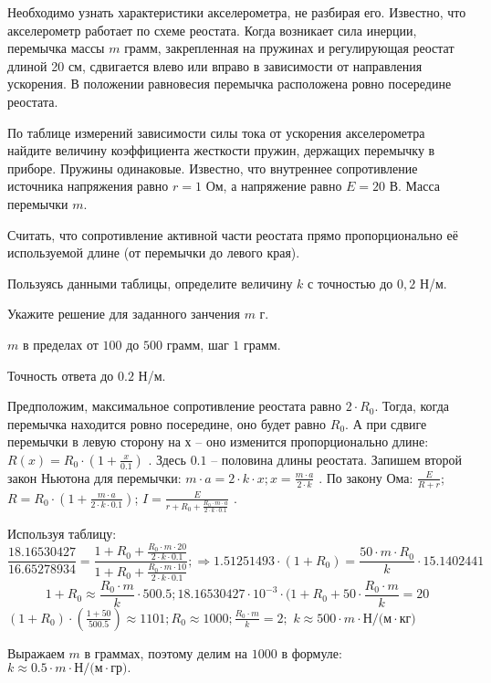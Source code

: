 
Необходимо узнать характеристики
акселерометра, не разбирая его. Известно, что акселерометр работает по схеме реостата. Когда возникает сила инерции,
перемычка массы $m$ грамм, закрепленная на пружинах и регулирующая реостат длиной
20 см, сдвигается влево или
вправо в зависимости от направления ускорения. В положении равновесия перемычка
расположена ровно посередине реостата.


По таблице измерений зависимости силы тока от
ускорения акселерометра найдите величину коэффициента жесткости пружин, держащих перемычку в приборе. Пружины
одинаковые. Известно, что
внутреннее сопротивление источника напряжения равно $r = 1$ Ом, а напряжение равно $E = 20$ В.  Масса
перемычки $m$.


Считать, что сопротивление активной части реостата прямо
пропорционально её используемой длине (от перемычки до левого края).

Пользуясь данными таблицы, определите величину $k$ с точностью до $0,2$ Н/м.

Укажите решение для заданного занчения $m$ г.

\paramSection

$m$ в пределах от $100$ до $500$ грамм, шаг $1$ грамм.  

Точность ответа  до  $0.2$  Н/м.

\solutionSection

Предположим, максимальное сопротивление реостата равно $2 \cdot R_0$. Тогда, когда перемычка находится 
ровно посередине, оно будет равно $R_0$. А при сдвиге перемычки в левую сторону на $х$ – оно изменится 
пропорционально длине: \linebreak $R(x)=R_0 \cdot (1+\frac{x}{0.1})$ . Здесь $0.1$ – половина длины реостата. 
Запишем второй закон Ньютона для перемычки:
$m \cdot a=2 \cdot k \cdot x;  x=\frac{m \cdot a}{2 \cdot k}$   . По закону Ома:   
$\frac{E}{R+r}$; $R=R_0 \cdot \left(1+\frac{m \cdot a}{2 \cdot k \cdot 0.1}\right)$; 
$I=  \frac{E}{r+R_0+\frac{R_0 \cdot m \cdot a}{2 \cdot k \cdot 0.1}}$ . 

Используя таблицу:
$$\frac{18.16530427}{16.65278934}=\frac{1+R_0+\frac{R_0 \cdot m \cdot 20}{2 \cdot k \cdot 0.1}}{1+R_0+\frac{R_0 \cdot m \cdot 10}{2 \cdot k \cdot 0.1}}; \Rightarrow  1.51251493 \cdot (1+R_0 )=\frac{50 \cdot m \cdot R_0}{k} \cdot 15.1402441$$
$$1+R_0 \approx   \frac{R_0 \cdot m}{k}   \cdot 500.5;  18.16530427 \cdot 10^{-3} \cdot (1+R_0+50 \cdot \frac{R_0 \cdot m}{k}=20$$
$(1+R_0 ) \cdot \left(\frac{1+50}{500.5}\right) \approx 1101;  R_0 \approx 1000;   \frac{R_0 \cdot m}{k}=2;$ 
$k \approx 500 \cdot m \cdot \text{Н/(м} \cdot \text{кг}) $  

Выражаем $m$ в граммах, поэтому делим на $1000$ в формуле:  $k \approx 0.5 \cdot m \cdot \text{Н/(м} \cdot \text{гр)}   .$

